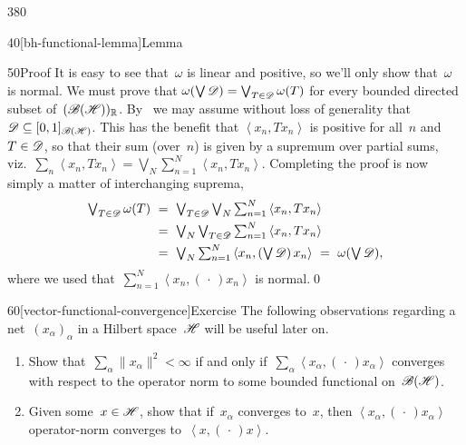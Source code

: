 \begin{parsec}{380}
\begin{point}{40}[bh-functional-lemma]{Lemma}
\begin{point}{50}{Proof}
It is easy to see that~$\omega$ is linear and positive,
so we'll only show that~$\omega$ is normal.
We must prove that $\omega(\bigvee \mathscr{D})=\bigvee_{T\in\mathscr{D}} \omega(T)$
for every bounded directed subset of~$(\mathscr{B}(\mathscr{H}))_{\mathbb{R}}$.
By~
we may assume without loss of generality that 
$\mathscr{D}\subseteq [0,1]_{\mathscr{B}(\mathscr{H})}$.
This has the benefit that $\left<x_n,T x_n\right>$
is positive for all~$n$ and~$T\in\mathscr{D}$,
so that their sum (over~$n$) is given by
a supremum over partial sums, viz.~$\sum_n\left<x_n,Tx_n\right>
=\bigvee_N\sum_{n=1}^N\left<x_n,Tx_n\right>$.
Completing the proof is now simply a matter of
interchanging suprema,
\begin{alignat*}{3}
	\textstyle \bigvee_{T\in \scrD} \omega(T)
	\ &=\ 
	\textstyle\bigvee_{T\in \scrD} \bigvee_N \sum_{n=1}^N 
	\left<x_n,Tx_n\right>\\
	\ &=\ 
	\textstyle\bigvee_N \bigvee_{T\in \scrD}\sum_{n=1}^N 
	\left<x_n,Tx_n\right>\\
	\ &=\ 
	\textstyle\bigvee_N \sum_{n=1}^N \left<x_n,(\bigvee \scrD )\,x_n\right>
	\ =\ \textstyle\omega(\bigvee\scrD),
\end{alignat*}
where we used that~$\sum_{n=1}^N \left<x_n,(\,\cdot\,)x_n\right>$
is normal.\qed
\end{point}
\end{point}
\begin{point}{60}[vector-functional-convergence]{Exercise}%
The following observations
regarding
a net~$(x_\alpha)_\alpha$ in a Hilbert space~$\mathscr{H}$
will be useful later on.
\begin{enumerate}
\item
Show that~$\sum_\alpha \|x_\alpha\|^2<\infty$
if and only if~$\sum_\alpha \left<x_\alpha,(\,\cdot\,)x_\alpha\right>$
converges with respect to the operator norm
to some bounded functional on~$\mathscr{B}(\mathscr{H})$.
\item
Given some~$x\in \mathscr{H}$,
show that if~$x_\alpha$ converges to~$x$,
then $\left<x_\alpha,(\,\cdot\,)x_\alpha\right>$
operator-norm converges to~$\left<x,(\,\cdot\,)x\right>$.
\end{enumerate}
\spacingfix
\end{point}%
\end{parsec}%
